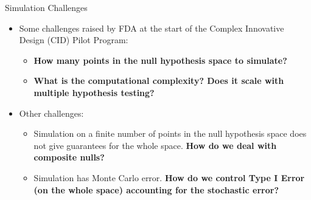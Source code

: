 \begin{frame}{Simulation Challenges}
\begin{itemize}
    \item Some challenges raised by FDA at the start of the Complex Innovative Design (CID) Pilot Program:
    \begin{itemize}
        \item \textbf{How many points in the null hypothesis space to simulate?}
        \item \textbf{What is the computational complexity? Does it scale with multiple hypothesis testing?}
    \end{itemize}
    \item Other challenges:
    \begin{itemize}
        \item Simulation on a finite number of points
        in the null hypothesis space does not give guarantees for the whole space. 
        \textbf{How do we deal with composite nulls?}
        \item Simulation has Monte Carlo error. 
        \textbf{How do we control
        Type I Error (on the whole space) 
        accounting for the stochastic error?}
    \end{itemize}
\end{itemize}
\end{frame}
